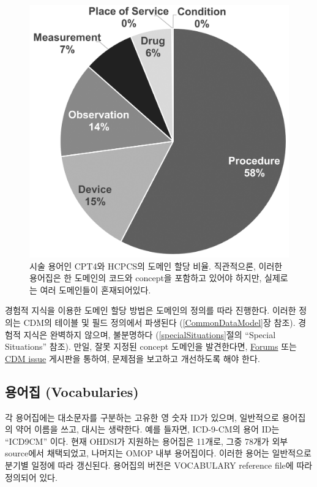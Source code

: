 \documentclass[11pt]{book}
\theoremstyle{definition}
\theoremstyle{definition}
\theoremstyle{definition}
\theoremstyle{remark}
\begin{document}
\begin{figure}

{\centering \includegraphics[width=0.7\linewidth]{images/StandardizedVocabularies/domains} 

}

\caption{시술 용어인 CPT4와 HCPCS의 도메인 할당 비율. 직관적으론, 이러한 용어집은 한 도메인의 코드와 concept을 포함하고 있어야 하지만, 실제로는 여러 도메인들이 혼재되어있다.}\label{fig:domains}
\end{figure}

경험적 지식을 이용한 도메인 할당 방법은 도메인의 정의를 따라 진행한다.
이러한 정의는 CDM의 테이블 및 필드 정의에서 파생된다
(\ref{CommonDataModel}장 참조). 경험적 지식은 완벽하지 않으며,
불분명하다 (\ref{specialSituations}절의 ``Special Situations'' 참조).
만일, 잘못 지정된 concept 도메인을 발견한다면,
\href{https://forums.ohdsi.org}{Forums} 또는
\href{https://github.com/OHDSI/CommonDataModel/issues}{CDM issue}
게시판을 통하여, 문제점을 보고하고 개선하도록 해야 한다.

\subsection{용어집 (Vocabularies)}\label{-vocabularies}

각 용어집에는 대소문자를 구분하는 고유한 영 숫자 ID가 있으며, 일반적으로
용어집의 약어 이름을 쓰고, 대시는 생략한다. 예를 들자면, ICD-9-CM의 용어
ID는 ``ICD9CM'' 이다. 현재 OHDSI가 지원하는 용어집은 11개로, 그중 78개가
외부 source에서 채택되었고, 나머지는 OMOP 내부 용어집이다. 이러한 용어는
일반적으로 분기별 일정에 따라 갱신된다. 용어집의 버전은 VOCABULARY
reference file에 따라 정의되어 있다. 
\end{document}

